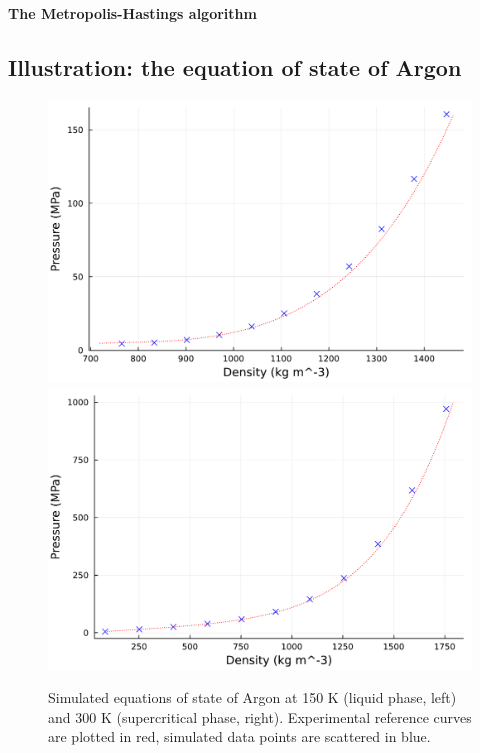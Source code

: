\paragraph{The Metropolis-Hastings algorithm}


\subsection{Illustration: the equation of state of Argon}
\begin{figure}[htbp]
    \begin{center}
      \includegraphics[width=0.49\linewidth]{figures/chapter1/argon_nvt_150K.pdf}
      \includegraphics[width=0.49\linewidth]{figures/chapter1/argon_nvt_300K.pdf}
      \caption{ \label{fig:eos_argon}
        Simulated equations of state of Argon at 150 K (liquid phase, left) and 300 K (supercritical phase, right). Experimental reference curves are plotted in red, simulated data points are scattered in blue.
      }
    \end{center}
  \end{figure}
